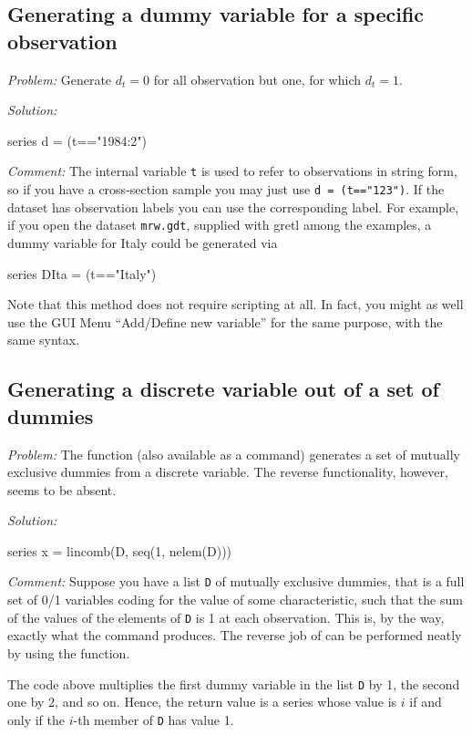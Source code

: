 \subsection{Generating a dummy variable for a specific observation}

\emph{Problem:} Generate $d_t = 0$ for all observation but one, for
which $d_t = 1$.

\emph{Solution:}
\begin{code}
  series d = (t=="1984:2")
\end{code}

\emph{Comment:} The internal variable \texttt{t} is used to refer to
observations in string form, so if you have a cross-section sample you
may just use \texttt{d = (t=="123")}. If the dataset has observation
labels you can use the corresponding label. For example, if you open the
dataset \texttt{mrw.gdt}, supplied with gretl among the
examples, a dummy variable for Italy could be generated via
\begin{code}
  series DIta = (t=="Italy")
\end{code}

Note that this method does not require scripting at all. In fact, you
might as well use the GUI Menu ``Add/Define new variable'' for the
same purpose, with the same syntax.

\subsection{Generating a discrete variable out of a set of dummies}

\emph{Problem:} The  function (also available as a
command) generates a set of mutually exclusive dummies from a discrete
variable. The reverse functionality, however, seems to be absent.

\emph{Solution:}
\begin{code}
series x = lincomb(D, seq(1, nelem(D)))
\end{code}

\emph{Comment:} Suppose you have a list \texttt{D} of mutually
exclusive dummies, that is a full set of 0/1 variables coding for the
value of some characteristic, such that the sum of the values of the
elements of \texttt{D} is 1 at each observation. This is, by the way,
exactly what the  command produces.  The reverse job of
 can be performed neatly by using the 
function.

The code above multiplies the first dummy variable in the list
\texttt{D} by 1, the second one by 2, and so on. Hence, the return
value is a series whose value is $i$ if and only if the $i$-th member
of \texttt{D} has value 1.

